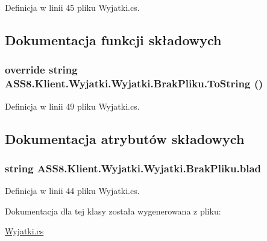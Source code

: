 Definicja w linii 45 pliku Wyjatki.cs.

\subsection{Dokumentacja funkcji składowych}
\hypertarget{a00036_f5b9bbc55ddd946c98f2cd3c4ae9b494}{
\subsubsection[{ToString}]{\setlength{\rightskip}{0pt plus 5cm}override string ASS8.Klient.Wyjatki.Wyjatki.BrakPliku.ToString ()}}
\label{de/d8c/a00036_f5b9bbc55ddd946c98f2cd3c4ae9b494}




Definicja w linii 49 pliku Wyjatki.cs.

\subsection{Dokumentacja atrybutów składowych}
\hypertarget{a00036_3c7c0c6922b7a786e1a7e61109ac7f80}{
\subsubsection[{blad}]{\setlength{\rightskip}{0pt plus 5cm}string ASS8.Klient.Wyjatki.Wyjatki.BrakPliku.blad}}
\label{de/d8c/a00036_3c7c0c6922b7a786e1a7e61109ac7f80}




Definicja w linii 44 pliku Wyjatki.cs.

Dokumentacja dla tej klasy została wygenerowana z pliku:\begin{CompactItemize}
\item 
\hyperlink{a00053}{Wyjatki.cs}\end{CompactItemize}
